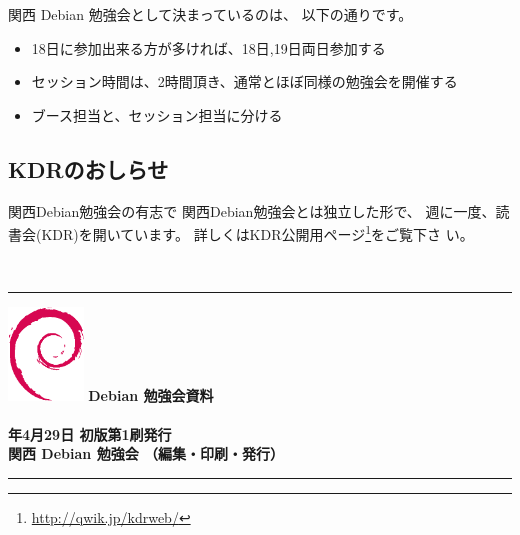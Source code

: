 \documentclass[mingoth,a4paper]{jsarticle}
\newcommand{\debmtgyear}{2008}
\newcommand{\debmtgdate}{29}
\newcommand{\debmtgmonth}{4}
\begin{document}
関西 Debian 勉強会として決まっているのは、
以下の通りです。

\begin{itemize}
 \item 18日に参加出来る方が多ければ、18日,19日両日参加する
 \item セッション時間は、2時間頂き、通常とほぼ同様の勉強会を開催する
 \item ブース担当と、セッション担当に分ける
\end{itemize}

\subsection{KDRのおしらせ}
関西Debian勉強会の有志で
関西Debian勉強会とは独立した形で、
週に一度、読書会(KDR)を開いています。
詳しくはKDR公開用ページ\footnote{\url{http://qwik.jp/kdrweb/}}をご覧下さ
い。

　
\printindex
 \cleartooddpage

 \begin{minipage}[b]{0.2\hsize}
 \end{minipage}
 \begin{minipage}[b]{0.8\hsize}

 \vspace*{15cm}
 \rule{\hsize}{1mm}
 \vspace{2mm}
 \includegraphics[width=2cm]{image200502/openlogo-nd.eps}
 \noindent \Large \bf Debian 勉強会資料\\ \\
 \noindent \normalfont \debmtgyear{}年\debmtgmonth{}月\debmtgdate{}日 \hspace{5mm}  初版第1刷発行\\
 \noindent \normalfont 関西 Debian 勉強会 （編集・印刷・発行）\\
 \rule{\hsize}{1mm}
 \end{minipage}
\end{document}
